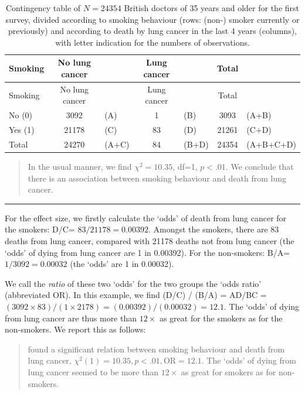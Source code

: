 \documentclass[
]{book}
\begin{document}
\begin{longtable}[]{@{}lclclcl@{}}
\caption{\label{tab:dollhill} Contingency table of \(N=24354\) British doctors of 35 years
and older for the first survey, divided according to smoking behaviour (rows: (non-)
smoker currently or previously) and according to death by lung cancer in the last
4 years (columns), with letter indication for the numbers
of observations.}\tabularnewline
\toprule
Smoking & No lung cancer & & Lung cancer & & Total &\tabularnewline
\midrule
\endfirsthead
\toprule
Smoking & No lung cancer & & Lung cancer & & Total &\tabularnewline
\midrule
\endhead
No (0) & 3092 & (A) & 1 & (B) & 3093 & (A+B)\tabularnewline
Yes (1) & 21178 & (C) & 83 & (D) & 21261 & (C+D)\tabularnewline
Total & 24270 & (A+C) & 84 & (B+D) & 24354 & (A+B+C+D)\tabularnewline
\bottomrule
\end{longtable}

\begin{quote}
In the usual manner, we find \(\chi^2=10.35\), df=1, \(p<.01\). We conclude that
there is an association between smoking behaviour and death from lung cancer.
\end{quote}

\begin{center}\rule{0.5\linewidth}{0.5pt}\end{center}

For the effect size, we firstly calculate the `odds' of death from
lung cancer for the smokers: D/C= \(83/21178 =0.00392\). Amongst the smokers,
there are 83 deaths from lung cancer, compared with 21178
deaths not from lung cancer (the `odds' of dying from
lung cancer are 1 in 0.00392). For the non-smokers:
B/A=\(1/3092 =0.00032\) (the `odds' are 1 in 0.00032).

We call the \emph{ratio} of these two `odds' for the two groups the
`odds ratio' (abbreviated OR). In this example, we find (D/C) / (B/A) =
AD/BC =
\((3092 \times 83) / (1 \times 2178) = (0.00392)/(0.00032) = 12.1\). The
`odds' of dying from lung cancer are thus more than \(12\times\)
as great for the smokers as for the non-smokers. We report this as follows:

\begin{quote}
\citet{DollHill1956} found a significant relation between
smoking behaviour and death from lung cancer,
\(\chi^2(1)=10.35, p<.01, \textrm{OR}=12.1\). The `odds' of dying from
lung cancer seemed to be more than \(12\times\) as great for smokers as for
non-smokers.
\end{quote}
\end{document}
